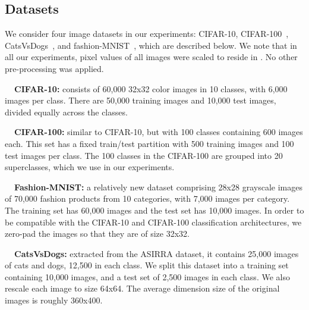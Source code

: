 \documentclass{article}
\begin{document}
	
	\subsection{Datasets}
	We consider four image datasets in our experiments: CIFAR-10, CIFAR-100~\cite{krizhevsky2009learning}, CatsVsDogs~\cite{elson2007asirra}, and fashion-MNIST~\cite{Xiao2017FashionMNISTAN}, which are described below.
	We note that in all our experiments, pixel values of all images were scaled to reside 
	in . No other pre-processing was applied.
	


		{\bf \textbullet \ \ CIFAR-10:} 
		consists of 60,000 32x32 color images in 10 classes, with 6,000 images per class. There are 50,000 training images and 10,000 test images, divided equally across the classes.
		
		{\bf \textbullet \ \ CIFAR-100:} 
		similar to CIFAR-10, but with 100 classes containing 600 images each. 
		This set has a fixed train/test partition with 500 training images and 100 test images per class. 
		The 100 classes in the CIFAR-100 are grouped into 20 superclasses, which we use in our experiments.
		
		{\bf \textbullet \ \ Fashion-MNIST:} 
		a relatively new dataset comprising 28x28 grayscale images of 70,000 fashion products from 10 categories, with 7,000 images per category. 
		The training set has 60,000 images and the test set has 10,000 images. In order to be compatible with the CIFAR-10 and CIFAR-100 classification architectures, we zero-pad the images so that they are of size 32x32.
		
		{\bf \textbullet \ \ CatsVsDogs:} 
		extracted from the ASIRRA dataset, it contains 
		25,000 images of cats and dogs, 12,500 in each class. We split this dataset into a training set 
		containing 10,000 images, and a test set of 2,500 images in each class. We also rescale 
		each image to size 64x64. The average dimension size of the original images is roughly 360x400.


	
	
	
	
	
\end{document}
